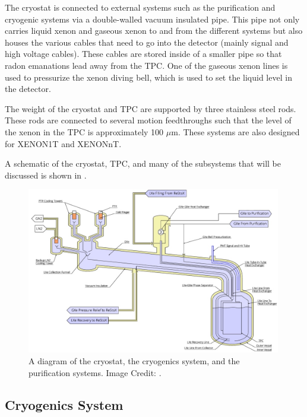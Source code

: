 The cryostat is connected to external systems such as the purification and cryogenic systems via a double-walled vacuum insulated pipe.  This pipe not only carries liquid xenon and gaseous xenon to and from the different systems but also houses the various cables that need to go into the detector (mainly signal and high voltage cables).  These cables are stored inside of a smaller pipe so that radon emanations lead away from the TPC.  One of the gaseous xenon lines is used to pressurize the xenon diving bell, which is used to set the liquid level in the detector.

The weight of the cryostat and TPC are supported by three stainless steel rods.  These rods are connected to several motion feedthroughs such that the level of the xenon in the TPC is approximately 100 $\mu$m.  These systems are also designed for XENON1T and XENONnT.

A schematic of the cryostat, TPC, and many of the subsystems that will be discussed is shown in .


\begin{figure}[t]
	\centering
	\includegraphics[width=0.99\textwidth]{diagram_cryo_pur_sys}
	\caption{A diagram of the cryostat, the cryogenics system, and the purification systems.  Image Credit: .}
	\label{fig:diagram_cryo_pur_sys}
\end{figure}


 \subsection{Cryogenics System}
 \label{sec:cryogenics_system}
 
